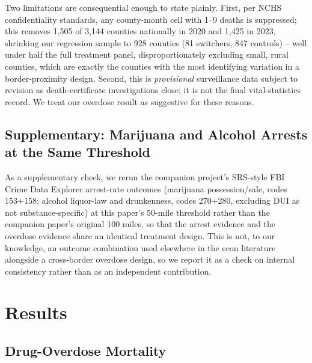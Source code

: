 \documentclass[11pt]{article}
\begin{document}
Two limitations are consequential enough to state plainly. First, per
NCHS confidentiality standards, any county-month cell with 1--9 deaths
is suppressed; this removes 1,505 of 3,144 counties nationally in 2020
and 1,425 in 2023, shrinking our regression sample to 928 counties (81
switchers, 847 controls) -- well under half the full treatment panel,
disproportionately excluding small, rural counties, which are exactly
the counties with the most identifying variation in a border-proximity
design. Second, this is \emph{provisional} surveillance data subject
to revision as death-certificate investigations close; it is not the
final vital-statistics record. We treat our overdose result as
suggestive for these reasons.

\subsection{Supplementary: Marijuana and Alcohol Arrests at the Same Threshold}

As a supplementary check, we rerun the companion project's SRS-style
FBI Crime Data Explorer arrest-rate outcomes (marijuana possession/sale,
codes 153+158; alcohol liquor-law and drunkenness, codes 270+280,
excluding DUI as not substance-specific) at this paper's 50-mile
threshold rather than the companion paper's original 100 miles, so
that the arrest evidence and the overdose evidence share an identical
treatment design. This is not, to our knowledge, an outcome combination
used elsewhere in the econ literature alongside a cross-border overdose
design, so we report it as a check on internal consistency rather than
as an independent contribution.

\section{Results}

\subsection{Drug-Overdose Mortality}
\end{document}
